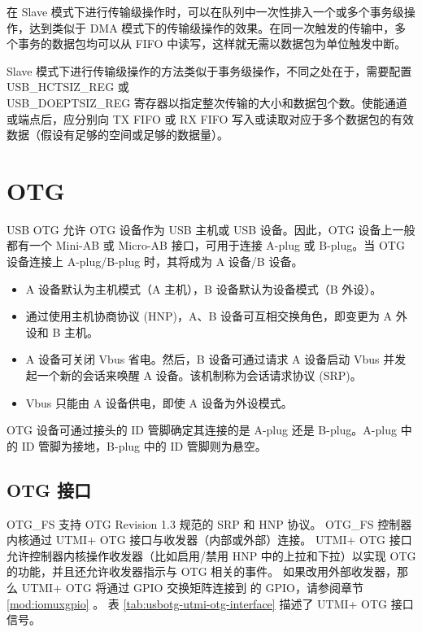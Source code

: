 \documentclass[main\_\_CN.tex]{subfiles}
\begin{document}
在 Slave 模式下进行传输级操作时，可以在队列中一次性排入一个或多个事务级操作，达到类似于 DMA 模式下的传输级操作的效果。在同一次触发的传输中，多个事务的数据包均可以从 FIFO 中读写，这样就无需以数据包为单位触发中断。

 Slave 模式下进行传输级操作的方法类似于事务级操作，不同之处在于，需要配置 USB\_HCTSIZ\_REG 或\\ USB\_DOEPTSIZ\_REG 寄存器以指定整次传输的大小和数据包个数。使能通道或端点后，应分别向 TX FIFO 或 RX FIFO 写入或读取对应于多个数据包的有效数据（假设有足够的空间或足够的数据量）。


\section{OTG}

USB OTG 允许 OTG 设备作为 USB 主机或 USB 设备。因此，OTG 设备上一般都有一个 Mini-AB 或 Micro-AB 接口，可用于连接 A-plug 或 B-plug。当 OTG 设备连接上 A-plug/B-plug 时，其将成为 A 设备/B 设备。

\begin{itemize}
    \item A 设备默认为主机模式（A 主机），B 设备默认为设备模式（B 外设）。
    \item 通过使用主机协商协议 (HNP)，A、B 设备可互相交换角色，即变更为 A 外设和 B 主机。
    \item A 设备可关闭 Vbus 省电。然后，B 设备可通过请求 A 设备启动 Vbus 并发起一个新的会话来唤醒 A 设备。该机制称为会话请求协议 (SRP)。
    \item Vbus 只能由 A 设备供电，即使 A 设备为外设模式。
\end{itemize}

OTG 设备可通过接头的 ID 管脚确定其连接的是 A-plug 还是 B-plug。A-plug 中的 ID 管脚为接地，B-plug 中的 ID 管脚则为悬空。


\subsection{OTG 接口}

OTG\_FS 支持 OTG Revision 1.3 规范的 SRP 和 HNP 协议。 OTG\_FS 控制器内核通过 UTMI+ OTG 接口与收发器（内部或外部）连接。 UTMI+ OTG 接口允许控制器内核操作收发器（比如启用/禁用 HNP 中的上拉和下拉）以实现 OTG 的功能，并且还允许收发器指示与 OTG 相关的事件。 如果改用外部收发器，那么 UTMI+ OTG 将通过 GPIO 交换矩阵连接到 \chipname{} 的 GPIO，请参阅章节 \ref{mod:iomuxgpio} \textit{}。 表 \ref{tab:usbotg-utmi-otg-interface} 描述了 UTMI+ OTG 接口信号。
\end{document}

